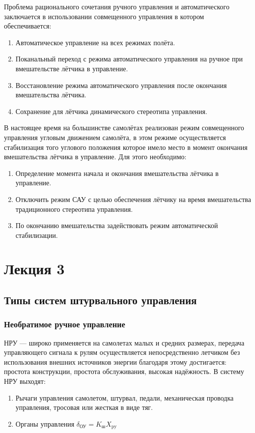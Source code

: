 \documentclass{article}
\begin{document}
Проблема рационального сочетания ручного управления и автоматического
заключается в использовании совмещенного управления в котором обеспечивается:
\begin{enumerate}
    \item Автоматическое управление на всех режимах полёта.
    \item Поканальный переход с режима автоматического управления на ручное при
        вмешательстве лётчика в управление.
    \item Восстановление режима автоматического управления после окончания
        вмешательства лётчика.
    \item Сохранение для лётчика динамического стереотипа управления.
\end{enumerate}
В настоящее время на большинстве самолётах реализован режим совмещенного
управления угловым движением самолёта, в этом режиме осуществляется
стабилизация того углового положения которое имело место в момент окончания
вмешательства лётчика в управление.
Для этого необходимо:
\begin{enumerate}
    \item Определение момента начала и окончания вмешательства лётчика в
        управление.
    \item Отключить режим САУ с целью обеспечения лётчику на время
        вмешательства традиционного стереотипа управления.
    \item По окончанию вмешательства задействовать режим автоматической
        стабилизации.
\end{enumerate}
\newpage

\section{Лекция 3}
\subsection{Типы систем штурвального управления}
\subsubsection{Необратимое ручное управление}
НРУ --- широко применяется на самолетах малых и средних размерах, передача
управляющего сигнала к рулям осуществляется непосредственно летчиком без
использования внешних источников энергии благодаря этому достигается: простота
конструкции, простота обслуживания, высокая надёжность.
В систему НРУ выходят:
\begin{enumerate}
    \item Рычаги управления самолетом, штурвал, педали, механическая проводка
        управления, тросовая или жесткая в виде тяг.
    \item Органы управления $\delta_\text{ОУ} = K_\text{ш} X_\text{py}$
\end{enumerate}
\end{document}
